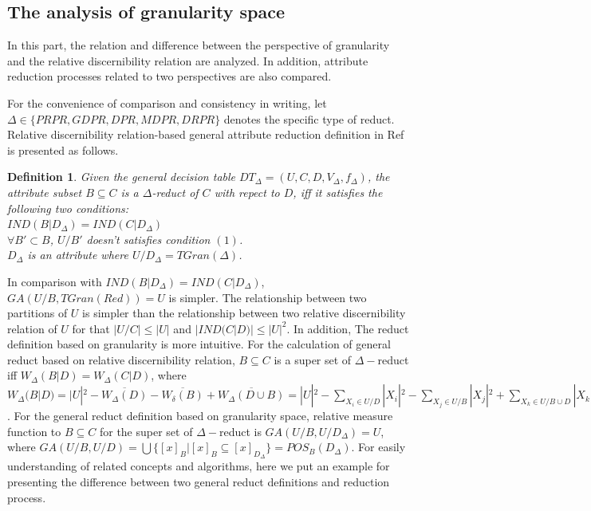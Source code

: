 \documentclass[review]{elsarticle}
\newtheorem*{OtherDef}{Definition}
\begin{document}
	\subsection{The analysis of granularity space}\label{ag}
		\par In this part, the relation and difference between the perspective of granularity and the relative discernibility relation are analyzed. In addition, attribute reduction processes related to two perspectives are also compared.
		\par For the convenience of comparison and consistency in writing, let $\Delta \in \{PRPR, GDPR, DPR, MDPR, DRPR\}$ denotes the specific type of reduct. Relative discernibility relation-based general attribute reduction definition in Ref \cite{ge2017quick} is presented as follows.\newline
		\begin{OtherDef} \label{rdrgrd}
			Given the general decision table $DT_\Delta=(U,C,D,V_\Delta,f_\Delta)$, the attribute subset $B\subseteq C$ is a $\Delta$-reduct of $C$ with repect to $D$, iff it satisfies the following two conditions:
			\\ $IND(B|D_\Delta)=IND(C|D_\Delta)$
			\\ $\forall B' \subset B$, $U/B'$ doesn't satisfies condition $(1)$.\\
			$D_\Delta$ is an attribute where $U/D_\Delta=TGran(\Delta)$.
		\end{OtherDef}
		 In comparison with $IND(B|D_\Delta)=IND(C|D_\Delta)$, $GA(U/B,TGran(Red))=U$ is simpler. The relationship between two partitions of $U$ is simpler than the relationship between two relative discernibility relation of $U$ for that $|U/C| \leq |U|$ and $|IND(C|D)| \leq |U|^2$. In addition, The reduct definition based on granularity is more intuitive. For the calculation of general reduct based on relative discernibility relation, $B\subseteq C$ is a super set of $\Delta-$reduct iff $W_\Delta(B|D)=W_\Delta(C|D)$, where $W_\Delta(B|D)=|U|^2-\overline{W_\Delta(D)}-\overline{W_\delta(B)}+\overline{W_\Delta(D \cup B)}=|U|^2-\sum_{X_i\in U/D}|X_i|^2-\sum_{X_j\in U/B}|X_j|^2+\sum_{X_k \in U/B\cup D}|X_k|^2$. For the general reduct definition based on granularity space, relative measure function to $B\subseteq C$ for the super set of $\Delta-$reduct is $GA(U/B,U/D_\Delta)=U$, where $GA(U/B,U/D)=\bigcup \{[x]_B|[x]_B \subseteq [x]_{D_\Delta}\}=POS_B(D_\Delta)$. For easily understanding of related concepts and algorithms, here we put an example for presenting the difference between two general reduct definitions and reduction process.\\
\end{document}
